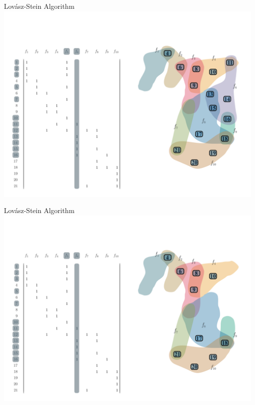 \documentclass[10pt]{beamer}
\begin{document}
\begin{frame}[fragile]{Lovász-Stein Algorithm}
    \vspace*{-3em}\hspace*{-2em}\includegraphics[width=1.15\textwidth]{Images/LSAExample/05}
\end{frame}

\begin{frame}[fragile]{Lovász-Stein Algorithm}
    \vspace*{-3em}\hspace*{-2em}\includegraphics[width=1.15\textwidth]{Images/LSAExample/06}
\end{frame}
\end{document}
